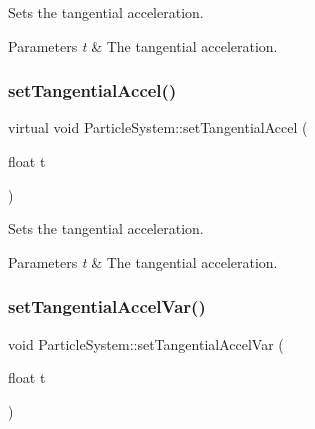 Sets the tangential acceleration.


\begin{DoxyParams}{Parameters}
{\em t} & The tangential acceleration. \\
\hline
\end{DoxyParams}
\mbox{\label{classParticleSystem_a07973f8b98df652a7b874d6936b29bd8}} 
\subsubsection{\texorpdfstring{set\+Tangential\+Accel()}{setTangentialAccel()}\hspace{0.1cm}{\footnotesize\ttfamily [2/2]}}
{\footnotesize\ttfamily virtual void Particle\+System\+::set\+Tangential\+Accel (\begin{DoxyParamCaption}\item[{float}]{t }\end{DoxyParamCaption})\hspace{0.3cm}{\ttfamily [virtual]}}

Sets the tangential acceleration.


\begin{DoxyParams}{Parameters}
{\em t} & The tangential acceleration. \\
\hline
\end{DoxyParams}
\mbox{\label{classParticleSystem_a35cce5656283f041c56add4ac4613855}} 
\subsubsection{\texorpdfstring{set\+Tangential\+Accel\+Var()}{setTangentialAccelVar()}\hspace{0.1cm}{\footnotesize\ttfamily [1/2]}}
{\footnotesize\ttfamily void Particle\+System\+::set\+Tangential\+Accel\+Var (\begin{DoxyParamCaption}\item[{float}]{t }\end{DoxyParamCaption})\hspace{0.3cm}{\ttfamily [virtual]}}

